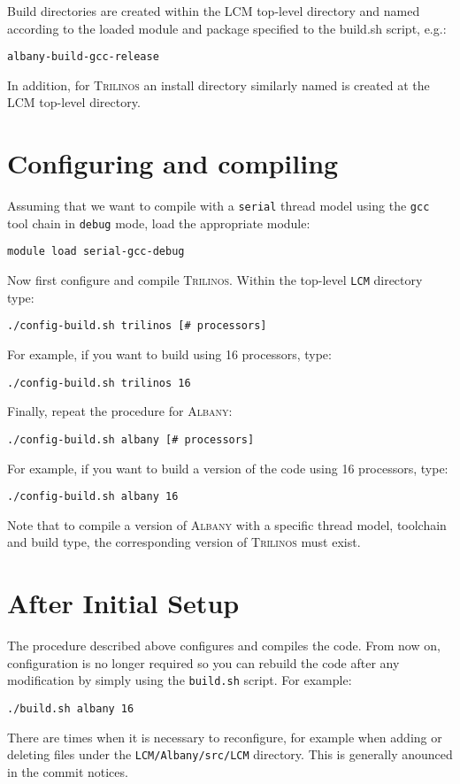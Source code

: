\documentclass{article}
\newcommand{\trilinos}{\textsc{Trilinos}}
\newcommand{\albany}{\textsc{Albany}}
\newcommand{\lcm}{\textsc{LCM}}
\begin{document}
Build directories are created within the \lcm{} top-level directory
and named according to the loaded module and package specified to the
build.sh script, e.g.:
\begin{verbatim}
albany-build-gcc-release
\end{verbatim}
In addition, for \trilinos{} an install directory similarly named is
created at the \lcm{} top-level directory.

\section{Configuring and compiling}

Assuming that we want to compile with a \verb+serial+ thread model
using the \verb+gcc+ tool chain in \verb+debug+ mode, load the
appropriate module:
\begin{verbatim}
module load serial-gcc-debug
\end{verbatim}
Now first configure and compile \trilinos{}. Within the top-level
\verb+LCM+ directory type:
\begin{verbatim}
./config-build.sh trilinos [# processors]
\end{verbatim}
For example, if you want to build using 16 processors, type:
\begin{verbatim}
./config-build.sh trilinos 16
\end{verbatim}
Finally, repeat the procedure for \albany{}:
\begin{verbatim}
./config-build.sh albany [# processors]
\end{verbatim}
For example, if you want to build a version of the code using 16
processors, type:
\begin{verbatim}
./config-build.sh albany 16
\end{verbatim}

Note that to compile a version of \albany{} with a specific thread model,
toolchain and build type, the corresponding version of \trilinos{} must
exist.

\section{After Initial Setup}
The procedure described above configures and compiles the code. From
now on, configuration is no longer required so you can rebuild the
code after any modification by simply using the \verb+build.sh+
script. For example:
\begin{verbatim}
./build.sh albany 16
\end{verbatim}
There are times when it is necessary to reconfigure, for example when
adding or deleting files under the \verb+LCM/Albany/src/LCM+
directory. This is generally anounced in the commit notices.
\end{document}

